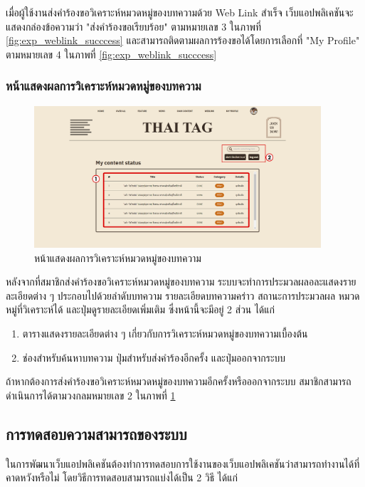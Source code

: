 \documentclass[12pt,oneside,openright,a4paper]{cpe-thai-project}
\begin{document}
          \hspace{1cm}เมื่อผู้ใช้งานส่งคำร้องขอวิเคราะห์หมวดหมู่ของบทความด้วย Web Link สำเร็จ 
          เว็บแอปพลิเคชันจะแสดงกล่องข้อความว่า "ส่งคำร้องขอเรียบร้อย" ตามหมายเลข 3 ในภาพที่ \ref{fig:exp_weblink_succcess}
          และสามารถติดตามผลการร้องขอได้โดยการเลือกที่ "My Profile" ตามหมายเลข 4 ในภาพที่ \ref{fig:exp_weblink_succcess} 

        \subsubsection{หน้าแสดงผลการวิเคราะห์หมวดหมู่ของบทความ}
          \begin{figure}[!ht]\centering
            \includegraphics[width=0.95\textwidth]{./img/project_ui/4_7.png}
            \caption{หน้าแสดงผลการวิเคราะห์หมวดหมู่ของบทความ}\label{fig:exp_result}
          \end{figure}
          \hspace{1cm}หลังจากที่สมาชิกส่งคำร้องขอวิเคราะห์หมวดหมู่ของบทความ ระบบจะทำการประมวลผลอละแสดงรายละเอียดต่าง ๆ 
          ประกอบไปด้วยลำดับบทความ รายละเอียดบทความคร่าว สถานะการประมวลผล หมวดหมู่ที่วิเคราะห์ได้ และปุ่มดูรายละเอียดเพิ่มเติม 
          ซึ่งหน้านี้จะมีอยู่ 2 ส่วน ได้แก่
          \begin{enumerate}
            \item ตารางแสดงรายละเอียดต่าง ๆ เกี่ยวกับการวิเคราะห์หมวดหมู่ของบทความเบื้องต้น
            \item ช่องสำหรับค้นหาบทความ ปุ่มสำหรับส่งคำร้องอีกครั้ง และปุ่มออกจากระบบ
          \end{enumerate}
          \hspace{1cm}ถ้าหากต้องการส่งคำร้องขอวิเคราะห์หมวดหมู่ของบทความอีกครั้งหรือออกจากระบบ สมาชิกสามารถดำเนินการได้ตามวงกลมหมายเลข 2 
          ในภาพที่ \ref{fig:exp_result} 

      \subsection{การทดสอบความสามารถของระบบ}
        \hspace{1cm}ในการพัฒนาเว็บแอปพลิเคชันต้องทำการทดสอบการใช้งานของเว็บแอปพลิเคชันว่าสามารถทำงานได้ที่คาดหวังหรือไม่ 
        โดยวิธีการทดสอบสามารถแบ่งได้เป็น 2 วิธี ได้แก่
\end{document}
